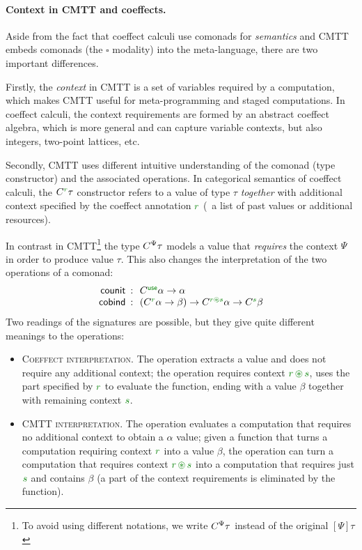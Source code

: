 \paragraph{Context in CMTT and coeffects.}
Aside from the fact that coeffect calculi use comonads for \emph{semantics} and CMTT embeds
comonads (the $\square$ modality) into the meta-language, there are two important differences.

Firstly, the \emph{context} in CMTT is a set of variables required by a computation, which
makes CMTT useful for meta-programming and staged computations. In coeffect calculi, the context
requirements are formed by an abstract coeffect algebra, which is more general and can capture
variable contexts, but also integers, two-point lattices, etc.

Secondly, CMTT uses different intuitive understanding of the comonad (type constructor) and
the associated operations. In categorical semantics of coeffect calculi, the $\ctyp{\cclrd{r}}{\tau}$
constructor refers to a value of type $\tau$ \emph{together} with additional context specified
by the coeffect annotation $\cclrd{r}$ (\eg~a list of past values or additional resources).

In contrast in CMTT\footnote{To avoid using different notations, we write $C^{\Psi}\tau$ instead of the
original $[\Psi]{\tau}$} the type $C^{\Psi}\tau$ models a value that \emph{requires} the
context $\Psi$ in order to produce value $\tau$. This also changes the interpretation of the
two operations of a comonad:
\begin{equation*}
\begin{array}{rcl}
 \ident{counit} &\narrow{:}& \ctyp{\cunit}{\alpha} \rightarrow \alpha\\
 \ident{cobind} &\narrow{:}& (\ctyp{\cclrd{r}}{\alpha} \rightarrow \beta) \rightarrow
    \ctyp{\cclrd{r}\cseq\cclrd{s}}{\alpha} \rightarrow \ctyp{\cclrd{s}}{\beta}
\end{array}
\end{equation*}
Two readings of the signatures are possible, but they give quite different meanings to the operations:

\begin{itemize}
\item \textsc{Coeffect interpretation.} The  operation extracts a value
  and does not require any additional context; the  operation requires
  context $\cclrd{r}\,\cseq\,\cclrd{s}$, uses the part specified by $\cclrd{r}$ to
  evaluate the function, ending with a value $\beta$ together with remaining context
  $\cclrd{s}$.
\item \textsc{CMTT interpretation.} The  operation evaluates a computation
  that requires no additional context to obtain a $\alpha$ value; given a function that
  turns a computation requiring context $\cclrd{r}$ into a value $\beta$, the 
  operation can turn a computation that requires context $\cclrd{r}\,\cseq\,\cclrd{s}$
  into a computation that requires just $\cclrd{s}$ and contains $\beta$ (a part of the
  context requirements is eliminated by the function).
\end{itemize}

